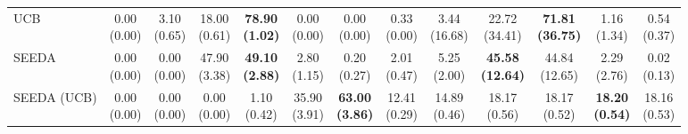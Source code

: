 \begin{table}[H]
{\begin{tabular}{l|cccccc|cccccc}
UCB & \makecell{0.00 \\ (0.00)} & \makecell{3.10 \\ (0.65)} & {\cellcolor[HTML]{C8E6C9}} \makecell{18.00 \\ (0.61)} & \bfseries \makecell{78.90 \\ (1.02)} & \makecell{0.00 \\ (0.00)} & \makecell{0.00 \\ (0.00)} & \makecell{0.33 \\ (0.00)} & \makecell{3.44 \\ (16.68)} & {\cellcolor[HTML]{C8E6C9}} \makecell{22.72 \\ (34.41)} & \bfseries \makecell{71.81 \\ (36.75)} & \makecell{1.16 \\ (1.34)} & \makecell{0.54 \\ (0.37)} \\
SEEDA & \makecell{0.00 \\ (0.00)} & \makecell{0.00 \\ (0.00)} & {\cellcolor[HTML]{C8E6C9}} \makecell{47.90 \\ (3.38)} & \bfseries \makecell{49.10 \\ (2.88)} & \makecell{2.80 \\ (1.15)} & \makecell{0.20 \\ (0.27)} & \makecell{2.01 \\ (0.47)} & \makecell{5.25 \\ (2.00)} & {\cellcolor[HTML]{C8E6C9}} \bfseries \makecell{45.58 \\ (12.64)} & \makecell{44.84 \\ (12.65)} & \makecell{2.29 \\ (2.76)} & \makecell{0.02 \\ (0.13)} \\
SEEDA (UCB) & \makecell{0.00 \\ (0.00)} & \makecell{0.00 \\ (0.00)} & {\cellcolor[HTML]{C8E6C9}} \makecell{0.00 \\ (0.00)} & \makecell{1.10 \\ (0.42)} & \makecell{35.90 \\ (3.91)} & \bfseries \makecell{63.00 \\ (3.86)} & \makecell{12.41 \\ (0.29)} & \makecell{14.89 \\ (0.46)} & {\cellcolor[HTML]{C8E6C9}} \makecell{18.17 \\ (0.56)} & \makecell{18.17 \\ (0.52)} & \bfseries \makecell{18.20 \\ (0.54)} & \makecell{18.16 \\ (0.53)} \\

\end{tabular}}
\end{table}
